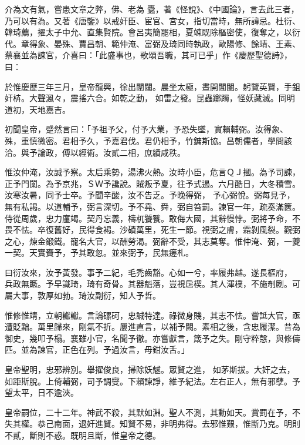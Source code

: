 \begin{pinyinscope}
 介為文有氣，嘗患文章之弊，佛、老為
 蠹，著《怪說》、《中國論》，言去此三者，乃可以有為。又著《唐鑒》以戒奸臣、宦官、宮女，指切當時，無所諱忌。杜衍、韓琦薦，擢太子中允、直集賢院。會呂夷簡罷相，夏竦既除樞密使，復奪之，以衍代。章得象、晏殊、賈昌朝、範仲淹、富弼及琦同時執政，歐陽修、餘靖、王素、蔡襄並為諫官，介喜曰：「此盛事也，歌頌吾職，其可已乎」作《慶歷聖德詩》，曰：



 於惟慶歷三年三月，皇帝龍興，徐出闈闥。晨坐太極，晝開閶闔。躬覽英賢，手鉏奸枿。大聲渢々，震搖六合。如乾之動，
 如雷之發。昆蟲躑躅，怪妖藏滅。同明道初，天地嘉吉。



 初聞皇帝，蹙然言曰：「予祖予父，付予大業，予恐失墜，實賴輔弼。汝得象、殊，重慎微密。君相予久，予嘉君伐。君仍相予，竹鏞斯協。昌朝儒者，學問該洽。與予論政，傅以經術。汝貳二相，庶績咸秩。



 惟汝仲淹，汝誠予察。太后乘勢，湯沸火熱。汝時小臣，危言ＱＪ摑。為予司諫，正予門闑。為予京兆，ＳＷ予讒說。賊叛予夏，往予式遏。六月酷日，大冬積雪。汝寒汝暑，同予士卒。予聞辛酸，汝不告乏。予晚得弼，
 予心弼悅。弼每見予，無有私謁。以道輔予，弼言深切。予不堯、舜，弼自笞罰。諫官一年，疏奏滿篋。侍從周歲，忠力廑竭。契丹忘義，檮杌饕餮。敢侮大國，其辭慢悖。弼將予命，不畏不怯。卒復舊好，民得食褐。沙磧萬里，死生一節。視弼之膚，霜剝風裂。觀弼之心，煉金鍛鐵。寵名大官，以酬勞渴。弼辭不受，其志莫奪。惟仲淹、弼，一夔一契。天實賚予，予其敢忽。並來弼予，民無瘥札。



 曰衍汝來，汝予黃發。事予二紀，毛禿齒豁。心如一兮，率履弗越。遂長樞府，
 兵政無蹶。予早識琦，琦有奇骨。其器魁落，豈視扂楔。其人渾樸，不施剞劂。可屬大事，敦厚如勃。琦汝副衍，知人予哲。



 惟修惟靖，立朝䡾䡾。言論磥砢，忠誠特達。祿微身賤，其志不怯。嘗詆大官，亟遭貶黜。萬里歸來，剛氣不折。屢進直言，以補予闕。素相之後，含忠履潔。昔為御史，幾叩予榻。襄雖小官，名聞予徹。亦嘗獻言，箴予之失。剛守粹愨，與修儔匹。並為諫官，正色在列。予過汝言，毋鉗汝舌。」



 皇帝聖明，忠邪辨別。舉擢俊良，掃除妖魃。眾賢之進，
 如茅斯拔。大奸之去，如距斯脫。上倚輔弼，司予調燮。下賴諫諍，維予紀法。左右正人，無有邪孽。予望太平，日不逾浹。



 皇帝嗣位，二十二年。神武不殺，其默如淵。聖人不測，其動如天。賞罰在予，不失其權。恭己南面，退奸進賢。知賢不易，非明弗得。去邪惟艱，惟斷乃克。明則不貳，斷則不惑。既明且斷，惟皇帝之德。




\end{pinyinscope}
